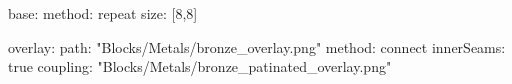 base:
  method: repeat
  size: [8,8]
  
overlay:
  path: "Blocks/Metals/bronze_overlay.png"
  method: connect
  innerSeams: true
  coupling: "Blocks/Metals/bronze_patinated_overlay.png"